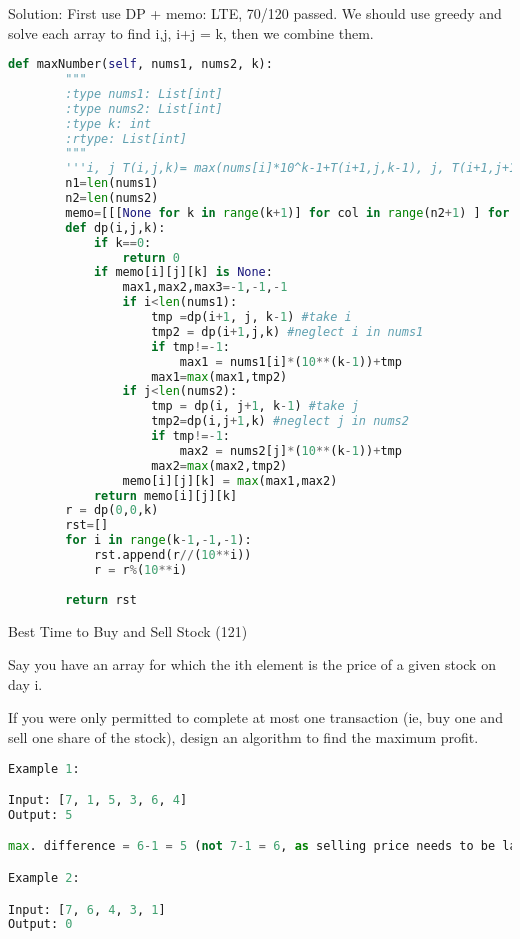 \documentclass[../specific-algorithms.tex]{subfiles}
\begin{document}
\begin{examples}
Solution: First use DP + memo: LTE, 70/120 passed. We should use greedy and solve each array to find i,j, i+j = k, then we combine them.
\begin{lstlisting}[language=Python]
def maxNumber(self, nums1, nums2, k):
        """
        :type nums1: List[int]
        :type nums2: List[int]
        :type k: int
        :rtype: List[int]
        """
        '''i, j T(i,j,k)= max(nums[i]*10^k-1+T(i+1,j,k-1), j, T(i+1,j+1,k)), for the third iterm, the restriction is we need the left       elements>=k'''
        n1=len(nums1)
        n2=len(nums2)
        memo=[[[None for k in range(k+1)] for col in range(n2+1) ] for row in range(n1+1)]
        def dp(i,j,k):
            if k==0:
                return 0
            if memo[i][j][k] is None:
                max1,max2,max3=-1,-1,-1
                if i<len(nums1):
                    tmp =dp(i+1, j, k-1) #take i
                    tmp2 = dp(i+1,j,k) #neglect i in nums1
                    if tmp!=-1:
                        max1 = nums1[i]*(10**(k-1))+tmp
                    max1=max(max1,tmp2)
                if j<len(nums2):
                    tmp = dp(i, j+1, k-1) #take j
                    tmp2=dp(i,j+1,k) #neglect j in nums2
                    if tmp!=-1:
                        max2 = nums2[j]*(10**(k-1))+tmp
                    max2=max(max2,tmp2)
                memo[i][j][k] = max(max1,max2)
            return memo[i][j][k] 
        r = dp(0,0,k)
        rst=[]
        for i in range(k-1,-1,-1):
            rst.append(r//(10**i))
            r = r%(10**i)
            
        return rst
\end{lstlisting}

\item Best Time to Buy and Sell Stock (121)

Say you have an array for which the ith element is the price of a given stock on day i.

If you were only permitted to complete at most one transaction (ie, buy one and sell one share of the stock), design an algorithm to find the maximum profit.
\begin{lstlisting}[language=Python]
Example 1:

Input: [7, 1, 5, 3, 6, 4]
Output: 5

max. difference = 6-1 = 5 (not 7-1 = 6, as selling price needs to be larger than buying price)

Example 2:

Input: [7, 6, 4, 3, 1]
Output: 0


\end{lstlisting}
\end{examples}
\end{document}
